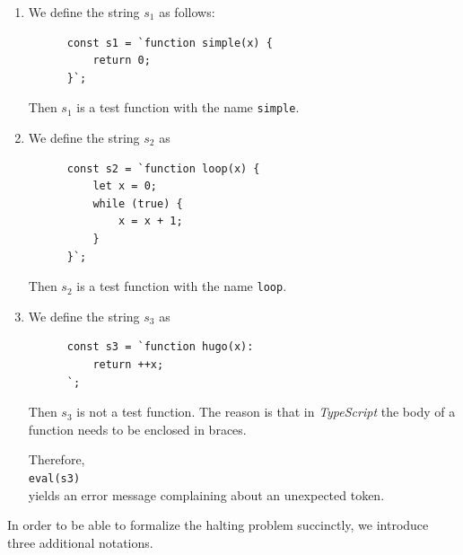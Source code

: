 \examplesEng
\begin{enumerate}
\item We define the string $s_1$ as follows:
      \begin{verbatim}
      const s1 = `function simple(x) {
          return 0;
      }`;
      \end{verbatim}
      \vspace*{-0.8cm}

      Then $s_1$ is a test function with the name \texttt{simple}.
\item We define the string $s_2$ as
      \begin{verbatim}
      const s2 = `function loop(x) {
          let x = 0;
          while (true) { 
              x = x + 1;
          }
      }`;
      \end{verbatim}
      \vspace*{-0.8cm}

      Then $s_2$ is a test function with the name \texttt{loop}.
\item We define the string $s_3$ as
      \begin{verbatim}
      const s3 = `function hugo(x):
          return ++x;
      `;
      \end{verbatim}
      \vspace*{-0.8cm}

      Then $s_3$ is not a test function.
      The reason is that in \textsl{TypeScript} the body of a function needs to be enclosed in braces.

      Therefore, 
      \\[0.2cm]
      \hspace*{1.3cm}
      \texttt{eval(s3)}
      \\[0.2cm]
      yields an error message complaining about an unexpected token.
\end{enumerate}
In order to be able to formalize the halting problem succinctly, we introduce three additional
notations.

